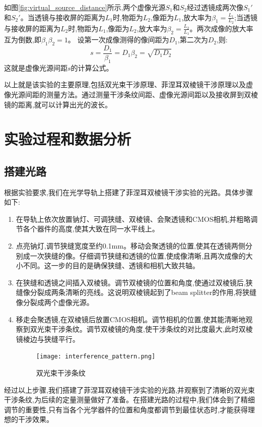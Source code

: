 \documentclass[UTF8]{ctexart}
\begin{document}
如图\ref{fig:virtual_source_distance}所示,两个虚像光源$S_1$和$S_2$经过透镜成两次像$S_1'$和$S_2'$。当透镜与接收屏的距离为$L_1$时,物距为$L_2$,像距为$L_1$,放大率为$\beta_1=\frac{L_1}{L_2}$;当透镜与接收屏的距离为$L_2$时,物距为$L_1$,像距为$L_2$,放大率为$\beta_2=\frac{L_2}{L_1}$。两次成像的放大率互为倒数,即$\beta_1\beta_2=1$。
设第一次成像测得的像间距为$D_1$,第二次为$D_2$,则:
$$s=\frac{D_1}{\beta_1}=D_1\beta_2=\sqrt{D_1D_2}$$
这就是虚像光源间距$s$的计算公式。

以上就是该实验的主要原理,包括双光束干涉原理、菲涅耳双棱镜干涉原理以及虚像光源间距的测量方法。通过测量干涉条纹间距、虚像光源间距以及接收屏到双棱镜的距离,就可以计算出光的波长。


\section{实验过程和数据分析}
\subsection{搭建光路}
根据实验要求,我们在光学导轨上搭建了菲涅耳双棱镜干涉实验的光路。具体步骤如下:

\begin{enumerate}
\item 在导轨上依次放置钠灯、可调狭缝、双棱镜、会聚透镜和CMOS相机,并粗略调节各个器件的高度,使其大致在同一水平线上。
\item 点亮钠灯,调节狭缝宽度至约0.1mm。移动会聚透镜的位置,使其在透镜两侧分别成一次狭缝的像。仔细调节狭缝和透镜的位置,使成像清晰,且两次成像的大小不同。这一步的目的是确保狭缝、透镜和相机大致共轴。
\item 在狭缝和透镜之间插入双棱镜。调节双棱镜的位置和角度,使通过双棱镜后,狭缝像分裂成两条清晰的亮线。这说明双棱镜起到了beam splitter的作用,将狭缝像分裂成两个虚像光源。
\item 移走会聚透镜,在双棱镜后放置CMOS相机。调节相机的位置,使其能清晰地观察到双光束干涉条纹。调节双棱镜的角度,使干涉条纹的对比度最大,此时双棱镜棱边与狭缝平行。

\begin{figure}[htbp]
    \centering
    \texttt{[image: interference\_pattern.png]}
    \caption{双光束干涉条纹}
    \label{fig:interference_pattern}
\end{figure}

\end{enumerate}

经过以上步骤,我们搭建了菲涅耳双棱镜干涉实验的光路,并观察到了清晰的双光束干涉条纹,为后续的定量测量做好了准备。在搭建光路的过程中,我们体会到了精细调节的重要性,只有当各个光学器件的位置和角度都调节到最佳状态时,才能获得理想的干涉效果。
\end{document}
